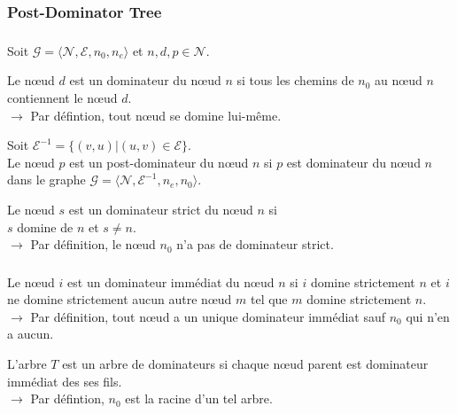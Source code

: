 \documentclass{beamer}
\begin{document}
    \subsubsection*{Post-Dominator Tree}
      \begin{frame}
        \frametitle{\subsecname}
        \framesubtitle{\subsubsecname}
        
        Soit $\mathcal{G} = \langle \mathcal{N}, \mathcal{E}, n_0, n_e \rangle$
        et $n, d, p \in \mathcal{N}$.
        \vspace{1em}

        Le n{\oe}ud $d$ est un dominateur du n{\oe}ud $n$
        si tous les chemins de $n_0$ au n{\oe}ud $n$
        contiennent le n{\oe}ud $d$. \\
        $\rightarrow$ Par défintion, tout n{\oe}ud se domine lui-même.
        \vspace{1em}\pause

        Soit $\mathcal{E}^{-1} = \{(v, u) | (u, v) \in \mathcal{E}\}$.\\
        Le n{\oe}ud $p$ est un post-dominateur du n{\oe}ud $n$
        si $p$ est dominateur du n{\oe}ud $n$
        dans le graphe $\mathcal{G} = \langle \mathcal{N}, \mathcal{E}^{-1},
        n_e, n_0 \rangle$.
        
        Le n{\oe}ud $s$ est un dominateur strict du n{\oe}ud $n$
        si \\ $s$ domine de $n$ et $s \neq n$. \\
        $\rightarrow$ Par définition, le n{\oe}ud $n_0$ n'a pas de dominateur strict.
        \end{frame}
        
      \begin{frame}
        \frametitle{\subsecname}
        \framesubtitle{\subsubsecname}
        
        Le n{\oe}ud $i$ est un dominateur immédiat du n{\oe}ud $n$
        si $i$ domine strictement $n$
        et $i$ ne domine strictement aucun autre n{\oe}ud $m$
        tel que $m$ domine strictement $n$. \\
        $\rightarrow$ Par définition, tout n{\oe}ud a un unique dominateur immédiat
        sauf $n_0$ qui n'en a aucun.
        \vspace{1em}\pause

        L'arbre $T$ est un arbre de dominateurs
        si chaque n{\oe}ud parent est dominateur immédiat des ses fils. \\
        $\rightarrow$ Par défintion, $n_0$ est la racine d'un tel arbre.
      \end{frame}
\end{document}
